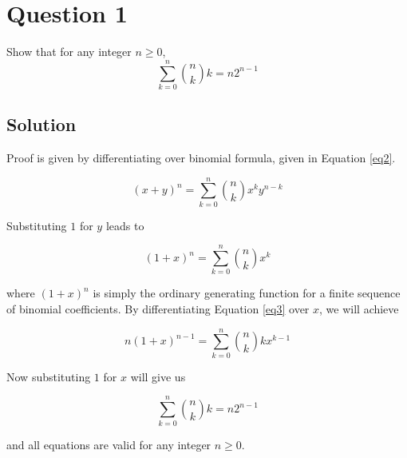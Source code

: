
\section*{Question 1}

Show that for any integer $n \geq 0$,
\begin{equation}
\sum_{k=0}^{n} {n \choose k}k = n2^{n-1}
\end{equation}

\subsection*{Solution}

Proof is given by differentiating over binomial formula, given in Equation \ref{eq2}.

\begin{equation}
(x + y)^n = \sum_{k=0}^{n}{n \choose k}x^ky^{n-k}
\label{eq2}
\end{equation}

Substituting $1$ for $y$ leads to

\begin{equation}
(1 + x)^n = \sum_{k=0}^{n}{n \choose k}x^k
\label{eq3}
\end{equation}

where $(1 + x)^n$ is simply the ordinary generating function for a finite sequence of binomial coefficients.
By differentiating Equation \ref{eq3} over $x$, we will achieve

\begin{equation}
n(1+x)^{n-1} = \sum_{k=0}^{n} {n \choose k}kx^{k-1}
\end{equation}

Now substituting $1$ for $x$ will give us

\begin{equation}
\sum_{k=0}^{n}{n \choose k}k = n2^{n-1}
\end{equation}

and all equations are valid for any integer $n \geq 0$.

